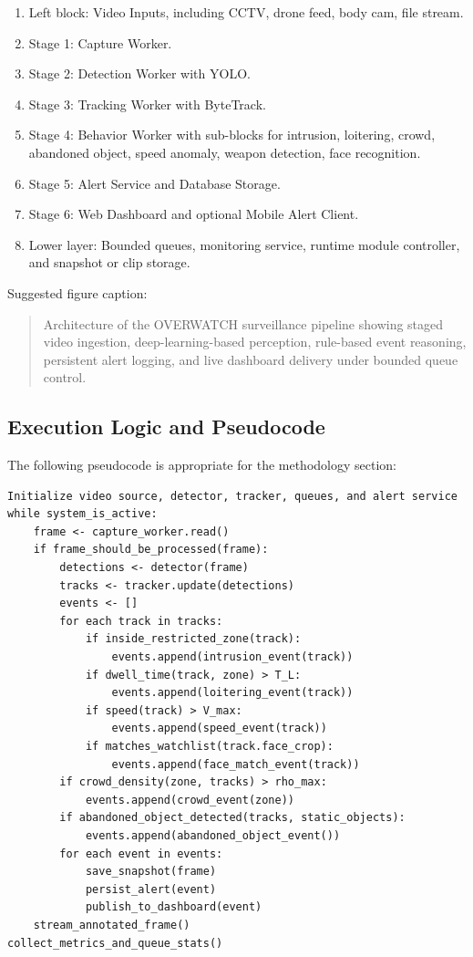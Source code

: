 \documentclass[11pt]{article}
\begin{document}
\begin{enumerate}
\item Left block: Video Inputs, including CCTV, drone feed, body cam, file stream.
\item Stage 1: Capture Worker.
\item Stage 2: Detection Worker with YOLO.
\item Stage 3: Tracking Worker with ByteTrack.
\item Stage 4: Behavior Worker with sub-blocks for intrusion, loitering, crowd, abandoned object, speed anomaly, weapon detection, face recognition.
\item Stage 5: Alert Service and Database Storage.
\item Stage 6: Web Dashboard and optional Mobile Alert Client.
\item Lower layer: Bounded queues, monitoring service, runtime module controller, and snapshot or clip storage.
\end{enumerate}

Suggested figure caption:

\begin{quote}
Architecture of the OVERWATCH surveillance pipeline showing staged video ingestion, deep-learning-based perception, rule-based event reasoning, persistent alert logging, and live dashboard delivery under bounded queue control.
\end{quote}

\subsection{Execution Logic and Pseudocode}
The following pseudocode is appropriate for the methodology section:

\begin{verbatim}
Initialize video source, detector, tracker, queues, and alert service
while system_is_active:
    frame <- capture_worker.read()
    if frame_should_be_processed(frame):
        detections <- detector(frame)
        tracks <- tracker.update(detections)
        events <- []
        for each track in tracks:
            if inside_restricted_zone(track):
                events.append(intrusion_event(track))
            if dwell_time(track, zone) > T_L:
                events.append(loitering_event(track))
            if speed(track) > V_max:
                events.append(speed_event(track))
            if matches_watchlist(track.face_crop):
                events.append(face_match_event(track))
        if crowd_density(zone, tracks) > rho_max:
            events.append(crowd_event(zone))
        if abandoned_object_detected(tracks, static_objects):
            events.append(abandoned_object_event())
        for each event in events:
            save_snapshot(frame)
            persist_alert(event)
            publish_to_dashboard(event)
    stream_annotated_frame()
collect_metrics_and_queue_stats()
\end{verbatim}
\end{document}
